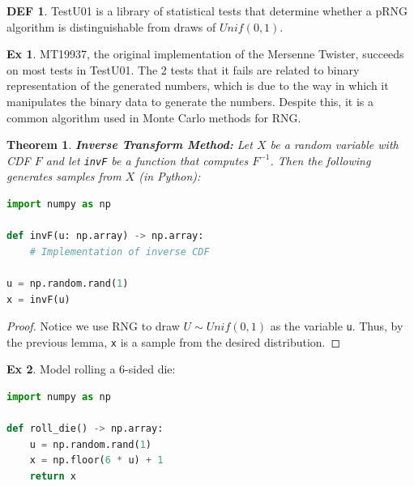 \documentclass{article}
\newtheorem{theorem}{Theorem}
\theoremstyle{definition}\newtheorem{definition}{DEF}
\theoremstyle{definition}\newtheorem{example}{Ex}
\theoremstyle{lemma}\newtheorem{lemma}{Lemma}
\theoremstyle{corrolary}\newtheorem{corrolary}{Cor}
\begin{document}
\begin{definition}
TestU01 is a library of statistical tests that determine whether a pRNG algorithm is distinguishable from draws of $Unif(0,1)$.
\end{definition}

\begin{example}
MT19937, the original implementation of the Mersenne Twister, succeeds on most tests in TestU01.
The 2 tests that it fails are related to binary representation of the generated numbers, which is due to the way in which it manipulates the binary data to generate the numbers.
Despite this, it is a common algorithm used in Monte Carlo methods for RNG.
\end{example}

\begin{theorem}
\textbf{Inverse Transform Method:}
Let $X$ be a random variable with CDF $F$ and let \verb|invF| be a function that computes $F^{-1}$.
Then the following generates samples from $X$ (in Python):
\end{theorem}
\begin{lstlisting}[language=Python]
import numpy as np

def invF(u: np.array) -> np.array:
    # Implementation of inverse CDF

u = np.random.rand(1)
x = invF(u)
\end{lstlisting}
\begin{proof}
Notice we use RNG to draw $U\sim Unif(0,1)$ as the variable \verb|u|.
Thus, by the previous lemma, \verb|x| is a sample from the desired distribution.
\end{proof}

\begin{example}
Model rolling a 6-sided die:
\begin{lstlisting}[language=Python]
import numpy as np

def roll_die() -> np.array:
    u = np.random.rand(1)
    x = np.floor(6 * u) + 1
    return x
\end{lstlisting}
\end{example}
\end{document}
